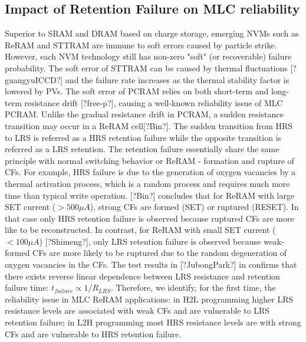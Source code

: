 \subsection{Impact of Retention Failure on MLC reliability}
 Superior to SRAM and DRAM based on charge storage, emerging NVMs such as ReRAM and STTRAM are immune to soft errors caused by particle strike. However, each NVM technology still has non-zero "soft" (or recoverable) failure probability. The soft error of STTRAM can be caused by thermal fluctuations [?guangyuICCD?] and the failure rate increases as the thermal stability factor is lowered by PVs. The soft error of PCRAM relies on both short-term and long-term resistance drift [?free-p?], causing a well-known reliability issue of MLC PCRAM. Unlike the gradual resistance drift in PCRAM, a sudden resistance transition may occur in a ReRAM cell[?Bin?]. The sudden transition from HRS to LRS is referred as a HRS retention failure while the opposite transition is referred as a LRS retention. The retention failure essentially share the same principle with normal switching behavior or ReRAM - formation and rupture of CFs. For example, HRS failure is due to the generation of oxygen vacancies by a thermal activation process, which is a random process and requires much more time than typical write operation. [?Bin?] concludes that for ReRAM with large SET current ($>500\mu A$), strong CFs are formed (SET) or ruptured (RESET). In that case only HRS retention failure is observed because ruptured CFs are more like to be reconstructed. In contrast, for ReRAM with small SET current ($<100\mu A$) [?Shimeng?], only LRS retention failure is observed because weak-formed CFs are more likely to be ruptured due to the random degeneration of oxygen vacancies in the CFs. The test results in [?JubongPark?] in confirms that there exists reverse linear dependence between LRS resistance and retention failure time: $t_{failure }\propto 1/R_{LRS}$. Therefore, we identify, for the first time, the reliability issue in MLC ReRAM applications: in H2L programming higher LRS resistance levels are associated with weak CFs and are vulnerable to LRS retention failure; in L2H programming most HRS resistance levels are with strong CFs and are vulnerable to HRS retention failure.
